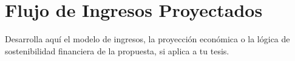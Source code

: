 \chapter{Flujo de Ingresos Proyectados}

Desarrolla aquí el modelo de ingresos, la proyección económica o la lógica de sostenibilidad financiera de la propuesta, si aplica a tu tesis.
